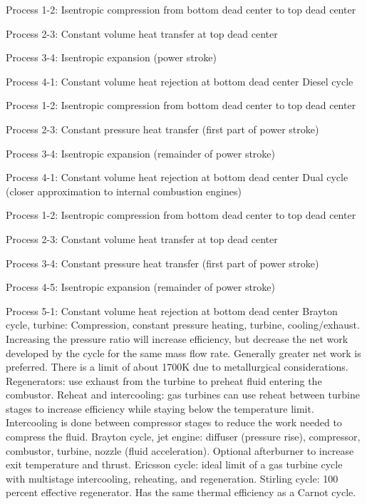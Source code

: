 \documentclass[paper=letter, fontsize=11pt]{scrartcl}
\numberwithin{equation}{section}        %
\numberwithin{figure}{section}          %
\numberwithin{table}{section}               %
\begin{document}
Process 1-2: Isentropic compression from bottom dead center to top dead center

Process 2-3: Constant volume heat transfer at top dead center

Process 3-4: Isentropic expansion (power stroke)

Process 4-1: Constant volume heat rejection at bottom dead center
\newline
\newline
Diesel cycle

Process 1-2: Isentropic compression from bottom dead center to top dead center

Process 2-3: Constant pressure heat transfer (first part of power stroke)

Process 3-4: Isentropic expansion (remainder of power stroke)

Process 4-1: Constant volume heat rejection at bottom dead center
\newline
\newline
Dual cycle (closer approximation to internal combustion engines)

Process 1-2: Isentropic compression from bottom dead center to top dead center

Process 2-3: Constant volume heat transfer at top dead center

Process 3-4: Constant pressure heat transfer (first part of power stroke)

Process 4-5: Isentropic expansion (remainder of power stroke)

Process 5-1: Constant volume heat rejection at bottom dead center
\newline
\newline
Brayton cycle, turbine: Compression, constant pressure heating, turbine, cooling/exhaust. Increasing the pressure ratio will increase efficiency, but decrease the net work developed by the cycle for the same mass flow rate. Generally greater net work is preferred. There is a limit of about 1700K due to metallurgical considerations.
\newline
\newline
Regenerators: use exhaust from the turbine to preheat fluid entering the combustor.
\newline
\newline
Reheat and intercooling: gas turbines can use reheat between turbine stages to increase efficiency while staying below the temperature limit. Intercooling is done between compressor stages to reduce the work needed to compress the fluid.
\newline
\newline
Brayton cycle, jet engine: diffuser (pressure rise), compressor, combustor, turbine, nozzle (fluid acceleration). Optional afterburner to increase exit temperature and thrust.
\newline
\newline
Ericsson cycle: ideal limit of a gas turbine cycle with multistage intercooling, reheating, and regeneration.
\newline
\newline
Stirling cycle: 100 percent effective regenerator. Has the same thermal efficiency as a Carnot cycle.
\end{document}
